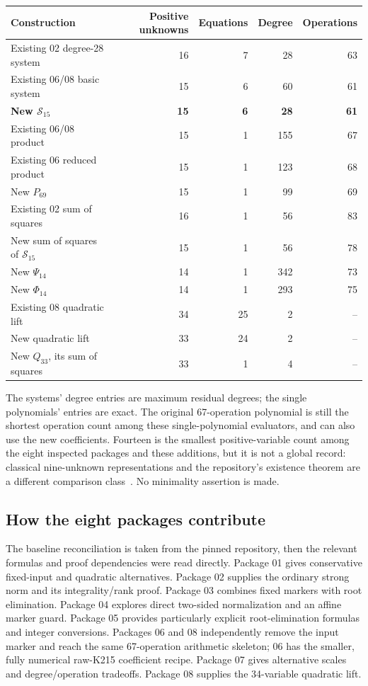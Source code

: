 \documentclass[11pt,a4paper]{article}
\theoremstyle{remark}\newtheorem{remark}[theorem]{Remark}
\begin{document}
\begin{center}\small
\begin{tabular}{lrrrr}
\toprule
Construction & Positive unknowns & Equations & Degree & Operations\\
\midrule
Existing 02 degree-28 system & 16 & 7 & 28 & 63\\
Existing 06/08 basic system & 15 & 6 & 60 & 61\\
\textbf{New \(\mathcal S_{15}\)} & \textbf{15} & \textbf{6} & \textbf{28} & \textbf{61}\\
Existing 06/08 product & 15 & 1 & 155 & 67\\
Existing 06 reduced product & 15 & 1 & 123 & 68\\
New \(P_{69}\) & 15 & 1 & 99 & 69\\
Existing 02 sum of squares & 16 & 1 & 56 & 83\\
New sum of squares of \(\mathcal S_{15}\) & 15 & 1 & 56 & 78\\
New \(\Psi_{14}\) & 14 & 1 & 342 & 73\\
New \(\Phi_{14}\) & 14 & 1 & 293 & 75\\
Existing 08 quadratic lift & 34 & 25 & 2 & --\\
New quadratic lift & 33 & 24 & 2 & --\\
New \(Q_{33}\), its sum of squares & 33 & 1 & 4 & --\\
\bottomrule
\end{tabular}
\end{center}
The systems' degree entries are maximum residual degrees; the single
polynomials' entries are exact. The original 67-operation polynomial is
still the shortest operation count among these single-polynomial
evaluators, and can also use the new coefficients. Fourteen is the
smallest positive-variable count among the eight inspected packages and
these additions, but it is not a global record: classical nine-unknown
representations and the repository's existence theorem are a different
comparison class~\cite{reconcile,nine}. No minimality assertion is made.

\subsection{How the eight packages contribute}
The baseline reconciliation is taken from the pinned repository, then
the relevant formulas and proof dependencies were read directly. Package
01 gives conservative fixed-input and quadratic alternatives. Package
02 supplies the ordinary strong norm and its integrality/rank proof.
Package 03 combines fixed markers with root elimination. Package 04
explores direct two-sided normalization and an affine marker guard.
Package 05 provides particularly explicit root-elimination formulas and
integer conversions. Packages 06 and 08 independently remove the input
marker and reach the same 67-operation arithmetic skeleton; 06 has the
smaller, fully numerical raw-K215 coefficient recipe. Package 07 gives
alternative scales and degree/operation tradeoffs. Package 08 supplies
the 34-variable quadratic lift.
\end{document}
